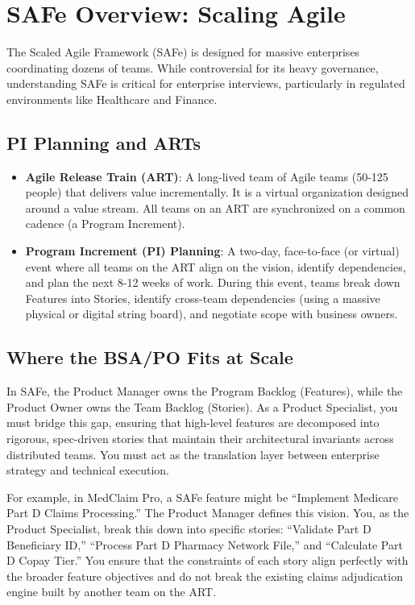 \documentclass[
  11pt,
  openany,
  oneside]{book}
\providecommand{\tightlist}{%
  \setlength{\itemsep}{0pt}\setlength{\parskip}{0pt}}
\begin{document}
\section{SAFe Overview: Scaling
Agile}\label{safe-overview-scaling-agile}

The Scaled Agile Framework (SAFe) is designed for massive enterprises
coordinating dozens of teams. While controversial for its heavy
governance, understanding SAFe is critical for enterprise interviews,
particularly in regulated environments like Healthcare and Finance.

\subsection{PI Planning and ARTs}\label{pi-planning-and-arts}

\begin{itemize}
\tightlist
\item
  \textbf{Agile Release Train (ART)}: A long-lived team of Agile teams
  (50-125 people) that delivers value incrementally. It is a virtual
  organization designed around a value stream. All teams on an ART are
  synchronized on a common cadence (a Program Increment).
\item
  \textbf{Program Increment (PI) Planning}: A two-day, face-to-face (or
  virtual) event where all teams on the ART align on the vision,
  identify dependencies, and plan the next 8-12 weeks of work. During
  this event, teams break down Features into Stories, identify
  cross-team dependencies (using a massive physical or digital string
  board), and negotiate scope with business owners.
\end{itemize}

\subsection{Where the BSA/PO Fits at
Scale}\label{where-the-bsapo-fits-at-scale}

In SAFe, the Product Manager owns the Program Backlog (Features), while
the Product Owner owns the Team Backlog (Stories). As a Product
Specialist, you must bridge this gap, ensuring that high-level features
are decomposed into rigorous, spec-driven stories that maintain their
architectural invariants across distributed teams. You must act as the
translation layer between enterprise strategy and technical execution.

For example, in MedClaim Pro, a SAFe feature might be ``Implement
Medicare Part D Claims Processing.'' The Product Manager defines this
vision. You, as the Product Specialist, break this down into specific
stories: ``Validate Part D Beneficiary ID,'' ``Process Part D Pharmacy
Network File,'' and ``Calculate Part D Copay Tier.'' You ensure that the
constraints of each story align perfectly with the broader feature
objectives and do not break the existing claims adjudication engine
built by another team on the ART.
\end{document}
